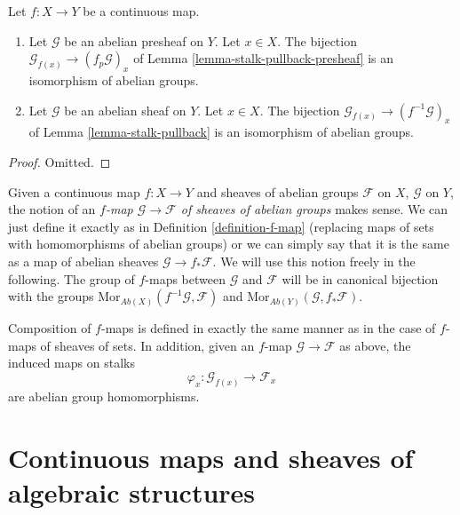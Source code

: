 \begin{lemma}
\label{lemma-pullback-abelian-stalk}
Let $f : X \to Y$ be a continuous map.
\begin{enumerate}
\item Let $\mathcal{G}$ be an abelian presheaf on $Y$.
Let $x \in X$. The bijection
$\mathcal{G}_{f(x)} \to (f_p\mathcal{G})_x$ of
Lemma \ref{lemma-stalk-pullback-presheaf} is an isomorphism of abelian groups.
\item Let $\mathcal{G}$ be an abelian sheaf on $Y$.
Let $x \in X$. The bijection
$\mathcal{G}_{f(x)} \to (f^{-1}\mathcal{G})_x$ of
Lemma \ref{lemma-stalk-pullback} is an isomorphism of abelian groups.
\end{enumerate}
\end{lemma}

\begin{proof}
Omitted.
\end{proof}

\noindent
Given a continuous map $f : X \to Y$ and sheaves of abelian
groups $\mathcal{F}$ on $X$, $\mathcal{G}$ on $Y$, the notion
of an {\it $f$-map $\mathcal{G} \to \mathcal{F}$
of sheaves of abelian groups} makes sense. We can just define
it exactly as in Definition \ref{definition-f-map} (replacing maps
of sets with homomorphisms of abelian groups) or we can
simply say that it is the same as a map of abelian
sheaves $\mathcal{G} \to f_*\mathcal{F}$. We will use this
notion freely in the following. The group of $f$-maps between
$\mathcal{G}$ and $\mathcal{F}$ will be in canonical bijection
with the groups
$\text{Mor}_{\textit{Ab}(X)}(f^{-1}\mathcal{G}, \mathcal{F})$
and 
$\text{Mor}_{\textit{Ab}(Y)}(\mathcal{G}, f_*\mathcal{F})$.

\medskip\noindent
Composition of $f$-maps is defined in exactly the
same manner as in the case of $f$-maps of sheaves of
sets. In addition, given an $f$-map $\mathcal{G} \to \mathcal{F}$
as above, the induced maps on stalks
$$
\varphi_x : \mathcal{G}_{f(x)} \longrightarrow \mathcal{F}_x
$$
are abelian group homomorphisms.


\section{Continuous maps and sheaves of algebraic structures}
\label{section-presheaves-structures-functorial}

